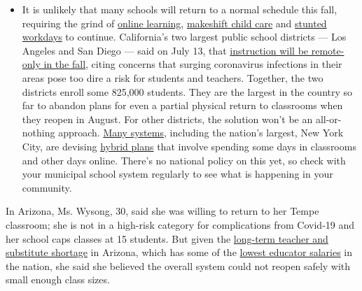 \begin{itemize}
  \begin{itemize}
  \tightlist
  \item
    It is unlikely that many schools will return to a normal schedule
    this fall, requiring the grind of
    \href{https://www.nytimes3xbfgragh.onion/2020/06/05/us/coronavirus-education-lost-learning.html?action=click\&pgtype=Article\&state=default\&region=MAIN_CONTENT_3\&context=storylines_faq}{online
    learning},
    \href{https://www.nytimes3xbfgragh.onion/2020/05/29/us/coronavirus-child-care-centers.html?action=click\&pgtype=Article\&state=default\&region=MAIN_CONTENT_3\&context=storylines_faq}{makeshift
    child care} and
    \href{https://www.nytimes3xbfgragh.onion/2020/06/03/business/economy/coronavirus-working-women.html?action=click\&pgtype=Article\&state=default\&region=MAIN_CONTENT_3\&context=storylines_faq}{stunted
    workdays} to continue. California's two largest public school
    districts --- Los Angeles and San Diego --- said on July 13, that
    \href{https://www.nytimes3xbfgragh.onion/2020/07/13/us/lausd-san-diego-school-reopening.html?action=click\&pgtype=Article\&state=default\&region=MAIN_CONTENT_3\&context=storylines_faq}{instruction
    will be remote-only in the fall}, citing concerns that surging
    coronavirus infections in their areas pose too dire a risk for
    students and teachers. Together, the two districts enroll some
    825,000 students. They are the largest in the country so far to
    abandon plans for even a partial physical return to classrooms when
    they reopen in August. For other districts, the solution won't be an
    all-or-nothing approach.
    \href{https://bioethics.jhu.edu/research-and-outreach/projects/eschool-initiative/school-policy-tracker/}{Many
    systems}, including the nation's largest, New York City, are
    devising
    \href{https://www.nytimes3xbfgragh.onion/2020/06/26/us/coronavirus-schools-reopen-fall.html?action=click\&pgtype=Article\&state=default\&region=MAIN_CONTENT_3\&context=storylines_faq}{hybrid
    plans} that involve spending some days in classrooms and other days
    online. There's no national policy on this yet, so check with your
    municipal school system regularly to see what is happening in your
    community.
  \end{itemize}
\end{itemize}

In Arizona, Ms. Wysong, 30, said she was willing to return to her Tempe
classroom; she is not in a high-risk category for complications from
Covid-19 and her school caps classes at 15 students. But given the
\href{https://www.nytimes3xbfgragh.onion/2018/05/02/us/arizona-teachers-philippines.html}{long-term
teacher and substitute shortage} in Arizona, which has some of the
\href{https://blogs.edweek.org/teachers/teaching_now/2019/04/which_states_have_the_highest_and_lowest_teacher_salaries.html}{lowest
educator salaries} in the nation, she said she believed the overall
system could not reopen safely with small enough class sizes.

